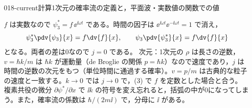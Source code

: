 \documentclass[uplatex,dvipdfmx,a4paper,11pt]{jsarticle}
\begin{document}
\begin{mondai}{018-current}{計算}{1次元の確率流の定義と，平面波・実数値の関数での値}
\begin{tadashii}
 $f$ は実数なので $\psi_{3}^{*}=f\,\ee^{\ii\omega t}$ である。時間の因子は $\ee^{\ii\omega t}\ee^{-\ii\omega t}=1$ で消え，
\[
  \psi_{3}^{*}\pdv{\psi_{3}}{x}=f\dv{f}{x},\qquad\psi_{3}\pdv{\psi_{3}^{*}}{x}=f\dv{f}{x}
\]
となる。両者の差は0なので $j=0$ である。
\kenzan 次元：1次元の $\rho$ は長さの逆数，$v=\hbar k/m$ は $\hbar k$ が運動量（de Broglie の関係 $p=\hbar k$）なので速度であり，$j$ は時間の逆数の次元をもつ（単位時間に通過する確率）。$v=p/m$ は古典的な粒子の速度と一致する。$k\to0$ では $j\to0$ で，(3) で $f$ を定数とした場合と合う。
\tsumazuki 複素共役の微分 $\partial\psi^{*}/\partial x$ で $\ii k$ の符号を変え忘れると，括弧の中が0になってしまう。また，確率流の係数は $\hbar/(2m\ii)$ で，分母に $\ii$ がある。
\end{tadashii}
\end{mondai}
\end{document}
